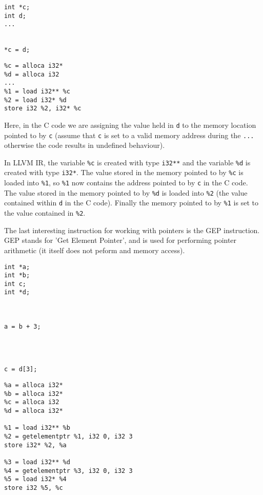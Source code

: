 \begin{minipage}[t]{0.5\linewidth}
\begin{verbatim}
int *c;
int d;
...


*c = d;
\end{verbatim}
\end{minipage}
\begin{minipage}[t]{0.5\linewidth}
\begin{verbatim}
%c = alloca i32*
%d = alloca i32
...
%1 = load i32** %c
%2 = load i32* %d
store i32 %2, i32* %c
\end{verbatim}
\end{minipage}

Here, in the C code we are assigning the value held in \verb!d! to the memory location pointed to by \verb!c! (assume that \verb!c! is set to a valid memory address during the \verb!...! otherwise the code results in undefined behaviour).

In LLVM IR, the variable \verb!%c! is created with type \verb!i32**! and the variable \verb!%d! is created with type \verb!i32*!.
The value stored in the memory pointed to by \verb!%c! is loaded into \verb!%1!, so \verb!%1! now contains the address pointed to by \verb!c! in the C code.
The value stored in the memory pointed to by \verb!%d! is loaded into \verb!%2! (the value contained within \verb!d! in the C code).
Finally the memory pointed to by \verb!%1! is set to the value contained in \verb!%2!.

The last interesting instruction for working with pointers is the GEP instruction.
GEP stands for 'Get Element Pointer', and is used for performing pointer arithmetic (it itself does not peform and memory access).

\begin{minipage}[t]{0.3\linewidth}
\begin{verbatim}
int *a;
int *b;
int c;
int *d;



a = b + 3;




c = d[3];
\end{verbatim}
\end{minipage}
\begin{minipage}[t]{0.7\linewidth}
\begin{verbatim}
%a = alloca i32*
%b = alloca i32*
%c = alloca i32
%d = alloca i32*

%1 = load i32** %b
%2 = getelementptr %1, i32 0, i32 3
store i32* %2, %a

%3 = load i32** %d
%4 = getelementptr %3, i32 0, i32 3
%5 = load i32* %4
store i32 %5, %c
\end{verbatim}
\end{minipage}


